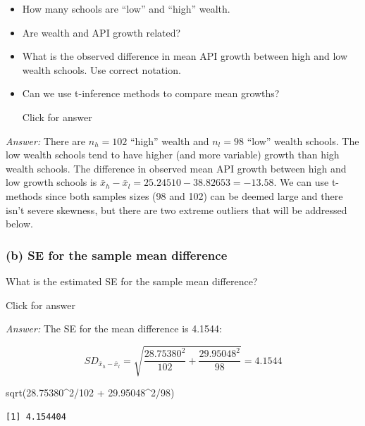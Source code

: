 \documentclass[
]{book}
\newenvironment{Shaded}{\begin{snugshade}}{\end{snugshade}}
\newcommand{\DecValTok}[1]{\textcolor[rgb]{0.00,0.00,0.81}{#1}}
\newcommand{\FloatTok}[1]{\textcolor[rgb]{0.00,0.00,0.81}{#1}}
\newcommand{\FunctionTok}[1]{\textcolor[rgb]{0.00,0.00,0.00}{#1}}
\newcommand{\NormalTok}[1]{#1}
\newcommand{\SpecialCharTok}[1]{\textcolor[rgb]{0.00,0.00,0.00}{#1}}
\providecommand{\tightlist}{%
  \setlength{\itemsep}{0pt}\setlength{\parskip}{0pt}}
\begin{document}
\begin{itemize}
\tightlist
\item
  How many schools are ``low'' and ``high'' wealth.
\item
  Are wealth and API growth related?
\item
  What is the observed difference in mean API growth between high and low wealth schools. Use correct notation.
\item
  Can we use t-inference methods to compare mean growths?

  Click for answer
\end{itemize}

\emph{Answer:} There are \(n_h = 102\) ``high'' wealth and \(n_l = 98\) ``low'' wealth schools. The low wealth schools tend to have higher (and more variable) growth than high wealth schools. The difference in observed mean API growth between high and low growth schools is \(\bar{x}_h - \bar{x}_l = 25.24510 - 38.82653 = -13.58\). We can use t-methods since both samples sizes (98 and 102) can be deemed large and there isn't severe skewness, but there are two extreme outliers that will be addressed below.

\hypertarget{b-se-for-the-sample-mean-difference}{%
\subsubsection{(b) SE for the sample mean difference}\label{b-se-for-the-sample-mean-difference}}

What is the estimated SE for the sample mean difference?

Click for answer

\emph{Answer:} The SE for the mean difference is 4.1544:

\[
SD_{\bar{x}_h - \bar{x}_l} = \sqrt{\dfrac{28.75380^2}{102} + \dfrac{29.95048^2}{98}} = 4.1544
\]

\begin{Shaded}
\begin{Highlighting}[]
\FunctionTok{sqrt}\NormalTok{(}\FloatTok{28.75380}\SpecialCharTok{\^{}}\DecValTok{2}\SpecialCharTok{/}\DecValTok{102} \SpecialCharTok{+}  \FloatTok{29.95048}\SpecialCharTok{\^{}}\DecValTok{2}\SpecialCharTok{/}\DecValTok{98}\NormalTok{)}
\end{Highlighting}
\end{Shaded}

\begin{verbatim}
[1] 4.154404
\end{verbatim}
\end{document}
